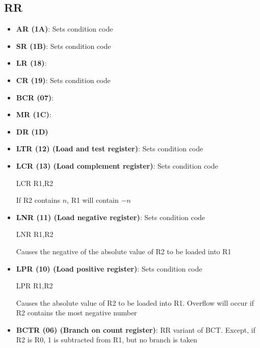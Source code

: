 \documentclass{report}
\begin{document}
    \bigbreak \noindent 
    \subsection{RR}
    \begin{itemize}
        \item \textbf{AR (1A)}: Sets condition code
        \item \textbf{SR (1B)}: Sets condition code
        \item \textbf{LR (18)}:
        \item \textbf{CR (19)}: Sets condition code
        \item \textbf{BCR (07)}:
        \item \textbf{MR (1C)}:
        \item \textbf{DR (1D)}
        \item \textbf{LTR (12) (Load and test register)}: Sets condition code
        \item \textbf{LCR (13) (Load complement register)}: Sets condition code
            \bigbreak \noindent 
            \begin{cppcode}
            LCR   R1,R2
            \end{cppcode}
            \bigbreak \noindent 
            If R2 contains $n$, R1 will contain $-n$
        \item \textbf{LNR (11) (Load negative register)}: Sets condition code
            \bigbreak \noindent 
            \begin{cppcode}
            LNR   R1,R2
            \end{cppcode}
            \bigbreak \noindent 
            Causes the negative of the absolute value of R2 to be loaded into R1
        \item \textbf{LPR (10) (Load positive register)}: Sets condition code
            \bigbreak \noindent 
            \begin{cppcode}
            LPR   R1,R2
            \end{cppcode}
            \bigbreak \noindent 
            Causes the absolute value of R2 to be loaded into R1. Overflow will occur if R2 contains the most negative number
        \item \textbf{BCTR (06) (Branch on count register)}: RR variant of BCT. Except, if R2 is R0, 1 is subtracted from R1, but no branch is taken

    \end{itemize}

    \bigbreak \noindent 
\end{document}
